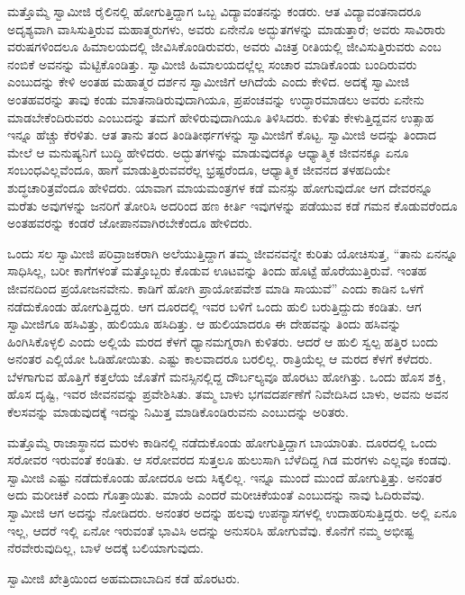  ಮತ್ತೊಮ್ಮೆ ಸ್ವಾಮೀಜಿ ರೈಲಿನಲ್ಲಿ ಹೋಗುತ್ತಿದ್ದಾಗ ಒಬ್ಬ ವಿದ್ಯಾವಂತನನ್ನು ಕಂಡರು. ಆತ ವಿದ್ಯಾವಂತನಾದರೂ ಅದೃಶ್ಯವಾಗಿ ವಾಸಿಸುತ್ತಿರುವ ಮಹಾತ್ಮರುಗಳು, ಅವರು ಏನೇನೊ ಅದ್ಭುತಗಳನ್ನು ಮಾಡುತ್ತಾರೆ; ಅವರು ಸಾವಿರಾರು ವರುಷಗಳಿಂದಲೂ ಹಿಮಾಲಯದಲ್ಲಿ ಜೀವಿಸಿಕೊಂಡಿರುವರು, ಅವರು ವಿಚಿತ್ರ ರೀತಿಯಲ್ಲಿ ಜೀವಿಸುತ್ತಿರುವರು ಎಂಬ ನಂಬಿಕೆ ಅವನನ್ನು ಮೆಟ್ಟಿಕೊಂಡಿತ್ತು. ಸ್ವಾಮೀಜಿ ಹಿಮಾಲಯದಲ್ಲೆಲ್ಲ ಸಂಚಾರ ಮಾಡಿಕೊಂಡು ಬಂದಿರುವರು ಎಂಬುದನ್ನು ಕೇಳಿ ಅಂತಹ ಮಹಾತ್ಮರ ದರ್ಶನ ಸ್ವಾಮೀಜಿಗೆ ಆಗಿದೆಯೆ ಎಂದು ಕೇಳಿದ. ಅದಕ್ಕೆ ಸ್ವಾಮೀಜಿ ಅಂತಹವರನ್ನು ತಾವು ಕಂಡು ಮಾತನಾಡಿರುವುದಾಗಿಯೂ, ಪ್ರಪಂಚವನ್ನು ಉದ್ಧಾರಮಾಡಲು ಅವರು ಏನೇನು ಮಾಡಬೇಕೆಂದಿರುವರು ಎಂಬುದನ್ನು ತಮಗೆ ಹೇಳಿರುವುದಾಗಿಯೂ ತಿಳಿಸಿದರು. ಕುಳಿತು ಕೇಳುತ್ತಿದ್ದವನ ಉತ್ಸಾಹ ಇನ್ನೂ ಹೆಚ್ಚು ಕೆರಳಿತು. ಆತ ತಾನು ತಂದ ತಿಂಡಿತೀರ್ಥಗಳನ್ನು ಸ್ವಾಮೀಜಿಗೆ ಕೊಟ್ಟ. ಸ್ವಾಮೀಜಿ ಅದನ್ನು ತಿಂದಾದ ಮೇಲೆ ಆ ಮನುಷ್ಯನಿಗೆ ಬುದ್ಧಿ ಹೇಳಿದರು. ಅದ್ಭುತಗಳನ್ನು ಮಾಡುವುದಕ್ಕೂ ಆಧ್ಯಾತ್ಮಿಕ ಜೀವನಕ್ಕೂ ಏನೂ ಸಂಬಂಧವಿಲ್ಲವೆಂದೂ, ಹಾಗೆ ಮಾಡುತ್ತಿರುವವರೆಲ್ಲ ಭ್ರಷ್ಟರೆಂದೂ, ಆಧ್ಯಾತ್ಮಿಕ ಜೀವನದ ತಳಹದಿಯೇ ಶುದ್ಧಚಾರಿತ್ರವೆಂದೂ ಹೇಳಿದರು. ಯಾವಾಗ ಮಾಯ\break ಮಂತ್ರಗಳ ಕಡೆ ಮನಸ್ಸು ಹೋಗುವುದೋ ಆಗ ದೇವರನ್ನೂ ಮರೆತು ಅವುಗಳನ್ನು ಜನರಿಗೆ ತೋರಿಸಿ ಅದರಿಂದ ಹಣ ಕೀರ್ತಿ ಇವುಗಳನ್ನು ಪಡೆಯುವ ಕಡೆ ಗಮನ ಕೊಡುವರೆಂದೂ ಅಂತಹವರನ್ನು ಕಂಡರೆ ಜೋಪಾನವಾಗಿರಬೇಕೆಂದೂ ಹೇಳಿದರು. 

 ಒಂದು ಸಲ ಸ್ವಾಮೀಜಿ ಪರಿವ್ರಾಜಕರಾಗಿ ಅಲೆಯುತ್ತಿದ್ದಾಗ ತಮ್ಮ ಜೀವನವನ್ನೇ ಕುರಿತು ಯೋಚಿಸುತ್ತ, “ತಾನು ಏನನ್ನೂ ಸಾಧಿಸಿಲ್ಲ, ಬರೀ ಕಾಗೆಗಳಂತೆ ಮತ್ತೊಬ್ಬರು ಕೊಡುವ ಊಟವನ್ನು ತಿಂದು ಹೊಟ್ಟೆ ಹೊರೆಯುತ್ತಿರುವೆ. ಇಂತಹ ಜೀವನದಿಂದ ಪ್ರಯೋಜನವೇನು. ಕಾಡಿಗೆ ಹೋಗಿ ಪ್ರಾಯೋಪವೇಶ ಮಾಡಿ ಸಾಯುವೆ” ಎಂದು ಕಾಡಿನ ಒಳಗೆ ನಡೆದುಕೊಂಡು ಹೋಗುತ್ತಿದ್ದರು. ಆಗ ದೂರದಲ್ಲಿ ಇವರ ಬಳಿಗೆ ಒಂದು ಹುಲಿ ಬರುತ್ತಿದ್ದುದು ಕಂಡಿತು. ಆಗ ಸ್ವಾಮೀಜಿಗೂ ಹಸಿವಿತ್ತು, ಹುಲಿಯೂ ಹಸಿದಿತ್ತು. ಆ ಹುಲಿಯಾದರೂ ಈ ದೇಹವನ್ನು ತಿಂದು ಹಸಿವನ್ನು ಹಿಂಗಿಸಿಕೊಳ್ಳಲಿ ಎಂದು ಅಲ್ಲಿಯೆ ಮರದ ಕೆಳಗೆ ಧ್ಯಾನಮಗ್ನರಾಗಿ ಕುಳಿತರು. ಆದರೆ ಆ ಹುಲಿ ಸ್ವಲ್ಪ ಹತ್ತಿರ ಬಂದು ಅನಂತರ ಎಲ್ಲಿಯೋ ಓಡಿಹೋಯಿತು. ಎಷ್ಟು ಕಾಲವಾದರೂ ಬರಲಿಲ್ಲ. ರಾತ್ರಿಯೆಲ್ಲ ಆ ಮರದ ಕೆಳಗೆ ಕಳೆದರು. ಬೆಳಗಾಗುವ ಹೊತ್ತಿಗೆ ಕತ್ತಲೆಯ ಜೊತೆಗೆ ಮನಸ್ಸಿನಲ್ಲಿದ್ದ ದೌರ್ಬಲ್ಯವೂ ಹೊರಟು ಹೋಗಿತ್ತು. ಒಂದು ಹೊಸ ಶಕ್ತಿ, ಹೊಸ ದೃಷ್ಟಿ, ಇವರ ಜೀವನವನ್ನು ಪ್ರವೇಶಿಸಿತು. ತಮ್ಮ ಬಾಳು ಭಗವದರ್ಪಣೆಗೆ ನಿವೇದಿಸಿದ ಬಾಳು, ಅವನು ಅವನ ಕೆಲಸವನ್ನು ಮಾಡುವುದಕ್ಕೆ ಇದನ್ನು ನಿಮಿತ್ತ ಮಾಡಿಕೊಂಡಿರುವನು ಎಂಬುದನ್ನು ಅರಿತರು. 

 ಮತ್ತೊಮ್ಮೆ ರಾಜಾಸ್ಥಾನದ ಮರಳು ಕಾಡಿನಲ್ಲಿ ನಡೆದುಕೊಂಡು ಹೋಗುತ್ತಿದ್ದಾಗ ಬಾಯಾರಿತು. ದೂರದಲ್ಲಿ ಒಂದು ಸರೋವರ ಇರುವಂತೆ ಕಂಡಿತು. ಆ ಸರೋವರದ ಸುತ್ತಲೂ ಹುಲುಸಾಗಿ ಬೆಳೆದಿದ್ದ ಗಿಡ ಮರಗಳು ಎಲ್ಲವೂ ಕಂಡವು. ಸ್ವಾಮೀಜಿ ಎಷ್ಟು ನಡೆದುಕೊಂಡು ಹೋದರೂ ಅದು ಸಿಕ್ಕಲಿಲ್ಲ. ಇನ್ನೂ ಮುಂದೆ ಮುಂದೆ ಹೋಗುತ್ತಿತ್ತು. ಅನಂತರ ಅದು ಮರೀಚಿಕೆ ಎಂದು ಗೊತ್ತಾಯಿತು. ಮಾಯೆ ಎಂದರೆ ಮರೀಚಿಕೆಯಂತೆ ಎಂಬುದನ್ನು ನಾವು ಓದಿರುವೆವು. ಸ್ವಾಮೀಜಿ ಆಗ ಅದನ್ನು ನೋಡಿದರು. ಅನಂತರ ಅದನ್ನು ಹಲವು ಉಪನ್ಯಾಸಗಳಲ್ಲಿ ಉದಾಹರಿಸುತ್ತಿದ್ದರು. ಅಲ್ಲಿ ಏನೂ ಇಲ್ಲ, ಆದರೆ ಇಲ್ಲಿ ಏನೋ ಇರುವಂತೆ ಭಾವಿಸಿ ಅದನ್ನು ಅನುಸರಿಸಿ ಹೋಗುವೆವು. ಕೊನೆಗೆ ನಮ್ಮ ಅಭೀಷ್ಟ ನೆರವೇರುವುದಿಲ್ಲ, ಬಾಳೆ ಅದಕ್ಕೆ ಬಲಿಯಾಗುವುದು. 

 ಸ್ವಾಮೀಜಿ ಖೇತ್ರಿಯಿಂದ ಅಹಮದಾಬಾದಿನ ಕಡೆ ಹೊರಟರು. 

